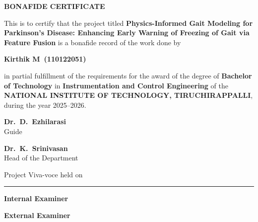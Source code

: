 \documentclass[12pt,a4paper,oneside]{report}
\numberwithin{equation}{chapter}
\numberwithin{figure}{chapter}
\numberwithin{table}{chapter}
\newcommand{\ThesisTitle}{Physics-Informed Gait Modeling for Parkinson's Disease: Enhancing Early Warning of Freezing of Gait via Feature Fusion}
\newcommand{\StudentName}{Kirthik M}
\newcommand{\RollNumber}{110122051}
\newcommand{\GuideName}{Dr.\ D.\ Ezhilarasi}
\newcommand{\HoDName}{Dr.\ K.\ Srinivasan}
\newcommand{\DeptName}{Instrumentation and Control Engineering}
\begin{document}
\newpage



\thispagestyle{empty}

\begin{center}
{\fontsize{14}{16}\selectfont\bfseries BONAFIDE CERTIFICATE}
\end{center}

\vspace{1.5cm}

This is to certify that the project titled \textbf{\ThesisTitle} is a bonafide record of the work done by

\vspace{0.8cm}

\begin{center}
{\fontsize{12}{14}\selectfont\bfseries \StudentName\ (\RollNumber)}
\end{center}

\vspace{0.8cm}

\noindent in partial fulfillment of the requirements for the award of the degree of \textbf{Bachelor of Technology} in \textbf{\DeptName} of the \textbf{NATIONAL INSTITUTE OF TECHNOLOGY, TIRUCHIRAPPALLI}, during the year 2025--2026.

\vspace{3.5cm}

\noindent
\begin{minipage}[t]{0.45\textwidth}
\centering
\textbf{\GuideName}\\
Guide
\end{minipage}
\hfill
\begin{minipage}[t]{0.45\textwidth}
\centering
\textbf{\HoDName}\\
Head of the Department
\end{minipage}

\vspace{4.0cm}

\noindent Project Viva-voce held on \rule{6cm}{0.4pt}

\vspace{2.5cm}

\noindent
\begin{minipage}[t]{0.45\textwidth}
\textbf{Internal Examiner}
\end{minipage}
\hfill
\begin{minipage}[t]{0.45\textwidth}
\raggedleft
\textbf{External Examiner}
\end{minipage}
\end{document}
